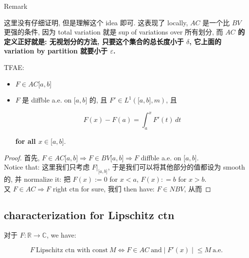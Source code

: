 \begin{qlremark}{Remark}

这里没有仔细证明, 但是理解这个 idea 即可. 这表现了 locally, \(AC\) 是一个比 \(BV\) 更强的条件, 因为 total variation 就是 sup of variations over 所有划分, 而 \textbf{\(AC\) 的定义正好就是: 无视划分的方法, 只要这个集合的总长度小于 \(\delta\), 它上面的 variation by partition 就要小于 \(\varepsilon\).}

\end{qlremark}

\begin{theorem}{}

TFAE:

\begin{itemize}
\item
  \(F \in AC\lbrack a,b\rbrack\)
\item
  \(F\) 是 diffble a.e. on \(\lbrack a,b\rbrack\) 的, 且 \(F' \in L^{1}(\lbrack a,b\rbrack,m)\), 且

  \[F(x) - F(a) = \int_{a}^{x}F'(t)\, dt\]

  \textbf{for all \(x \in \lbrack a,b\rbrack\)}.
\end{itemize}

\end{theorem}

\begin{proof}

首先, \(F \in AC\lbrack a,b\rbrack\Longrightarrow F \in BV\lbrack a,b\rbrack\Longrightarrow F\) diffble a.e. on \(\lbrack a,b\rbrack\).\\
Notice that: 这里我们只考虑 \(F|_{\lbrack a,b\rbrack}\), 于是我们可以将其他部分的值都设为 smooth 的, 并 normalize it: 把 \(F(x) := 0\) for \(x < a\), \(F(x): = b\) for \(x > b\).\\
又 \(F \in AC\Longrightarrow F\) right ctn for sure, 我们 then have: \(F \in NBV\), 从而

\end{proof}

\subsection{characterization for Lipschitz ctn}\label{characterization-for-lipschitz-ctn}

\begin{theorem}{}

对于 \(F:\mathbb{R}\rightarrow\mathbb{C}\), we have:

\[\left. F\ \text{Lipschitz ctn with const}\ M\Leftrightarrow F \in AC\ \text{and} \middle| F'(x) \middle| \leq M\ \text{a.e.} \right.\]

\end{theorem}

